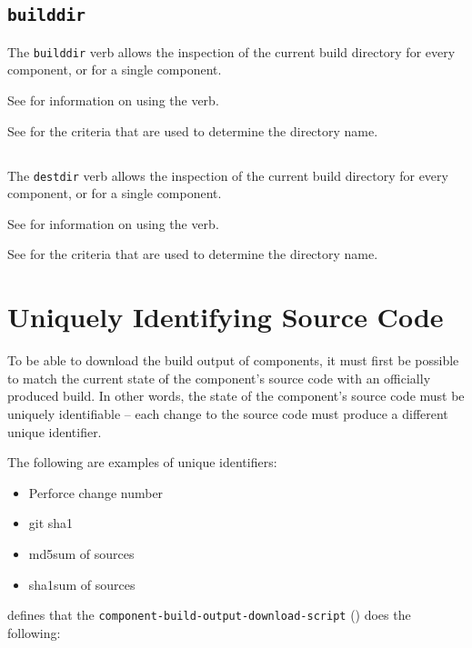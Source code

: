 \subsection{\texttt{builddir}}

The \lmsbw \texttt{builddir} verb allows the inspection of
the current build directory for every component, or for a single
component.

See  for information on using the verb.

See  for the criteria that are used to
determine the directory name.

\subsection{\destdir}
The \lmsbw \texttt{destdir} verb allows the inspection of
the current build directory for every component, or for a single
component.

See  for information on using the verb.

See  for the criteria that are used
to determine the directory name.

\section{Uniquely Identifying Source Code}
\label{tips:uniquely-identify-source-code}

To be able to download the build output of components, it must first
be possible to match the current state of the component's source code
with an officially produced build.  In other words, the state of the
component's source code must be uniquely identifiable -- each change to
the source code must produce a different unique identifier.

The following are examples of unique identifiers:

\begin{itemize}
\item{Perforce change number}
\item{git sha1}
\item{md5sum of sources}
\item{sha1sum of sources}
\end{itemize}

\lmsbw defines that the
\texttt{component-build-output-download-script}
() does the
following:

